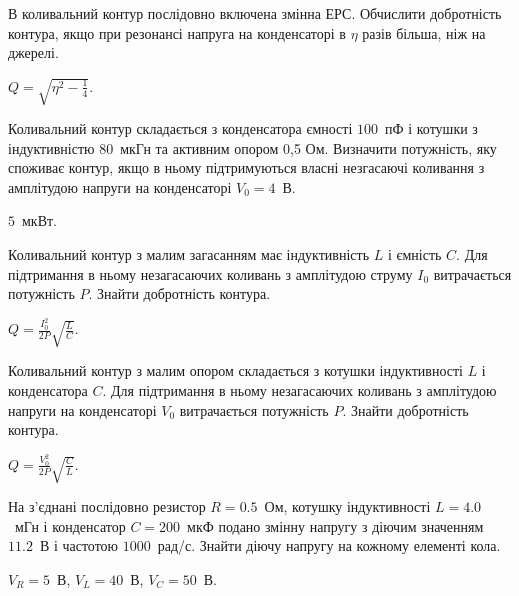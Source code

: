 \begin{problem}%
    В коливальний контур послідовно включена змінна ЕРС. Обчислити
    добротність контура, якщо при резонансі напруга на конденсаторі в $\eta$ разів більша, ніж на джерелі.
\begin{solution}
    $Q = \sqrt{\eta^2 - \frac14}$.
\end{solution}
\end{problem}



\begin{problem}%
    Коливальний контур складається з конденсатора ємності $100$~пФ і котушки з індуктивністю $80$~мкГн та активним опором 0,5 Ом. Визначити потужність, яку споживає контур, якщо в ньому підтримуються власні незгасаючі коливання з амплітудою напруги на конденсаторі $V_0 = 4$~В.
\begin{solution}
    $5$~мкВт.
\end{solution}
\end{problem}

\begin{problem}%
    Коливальний контур з малим загасанням має індуктивність $L$ і ємність
    $C$. Для підтримання в ньому незагасаючих коливань з амплітудою струму $I_0$ витрачається потужність $P$. Знайти добротність контура.
\begin{solution}
    $Q = \frac{I_0^2}{2P}\sqrt{\frac{L}{C}}$.
\end{solution}
\end{problem}


\begin{problem}%
    Коливальний контур з малим опором складається з котушки індуктивності $L$ і конденсатора $C$. Для підтримання в ньому незагасаючих коливань з
    амплітудою напруги на конденсаторі $V_0$ витрачається потужність $P$. Знайти добротність контура.
\begin{solution}
    $Q = \frac{V_0^2}{2P}\sqrt{\frac{C}{L}}$.
\end{solution}
\end{problem}

\begin{problem}%
    На з'єднані послідовно резистор $R = 0.5$~Ом, котушку індуктивності
    $L = 4.0$~мГн і конденсатор $C = 200$~мкФ подано змінну напругу з діючим значенням $11.2$~В і частотою $1000$~рад/с. Знайти діючу напругу на кожному елементі кола.
\begin{solution}
    $V_R = 5$~В, $V_L = 40$~В, $V_C = 50$~В.
\end{solution}
\end{problem}



